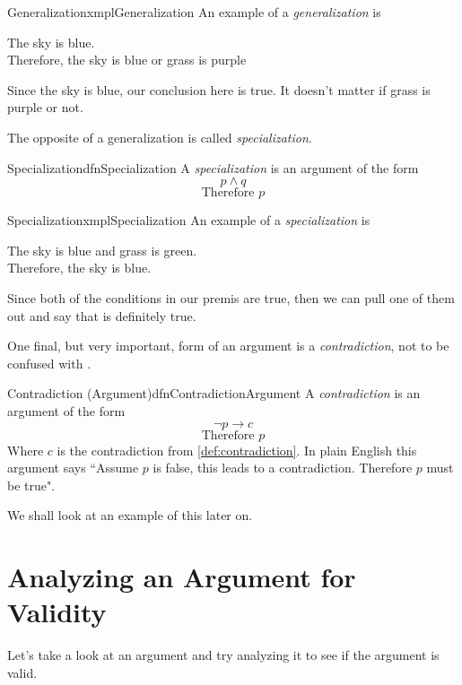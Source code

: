 \begin{exmpl}[label={exmpl:generalization}]{Generalization}{xmplGeneralization}
    An example of a \emph{generalization} is
    \begin{center}
        The sky is blue.\\
        Therefore, the sky is blue or grass is purple
    \end{center}
    Since the sky is blue, our conclusion here is true. It doesn't matter if grass is purple or not.
\end{exmpl}
\vspace{1cm}

The opposite of a generalization is called \emph{specialization}.

\begin{dfn}[label={def:specialization}]{Specialization}{dfnSpecialization}
    A \emph{specialization} is an argument of the form
    $$p \land q$$
    $$\text{Therefore } p$$
\end{dfn}

\begin{exmpl}[label={exmpl:specialization}]{Specialization}{xmplSpecialization}
    An example of a \emph{specialization} is
    \begin{center}
        The sky is blue and grass is green.\\
        Therefore, the sky is blue.
    \end{center}
    Since both of the conditions in our premis are true, then we can pull one of them out and say that is definitely true.
\end{exmpl}
\newpage

One final, but very important, form of an argument is a \emph{contradiction}, not to be confused with .

\begin{dfn}[label={def:contradictionArgument}]{Contradiction (Argument)}{dfnContradictionArgument}
    A \emph{contradiction} is an argument of the form
    $$\lnot p \to c$$
    $$\text{Therefore } p$$
    Where $c$ is the contradiction from \cref{def:contradiction}. In plain English this argument says ``Assume $p$ is false, this leads to a contradiction. Therefore $p$ must be true".
\end{dfn}
\vspace{1cm}
We shall look at an example of this later on.

\section{Analyzing an Argument for Validity}
Let's take a look at an argument and try analyzing it to see if the argument is valid.

